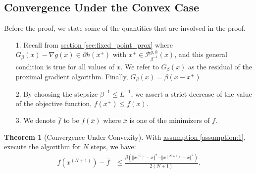 \documentclass[]{article}
\theoremstyle{definition}
\newtheorem{theorem}{Theorem}       %
\begin{document}
    \subsection{Convergence Under the Convex Case}
        Before the proof, we state some of the quantities that are involved in the proof. 
        \begin{enumerate}
            \item [1.] Recall from \hyperref[sec:fixed_point_prox]{section \ref*{sec:fixed_point_prox}} where $G_\beta(x) - \nabla g(x) \in \partial h(x^+)$ with $x^+ \in \mathcal P_{\beta^{-1}}^{g, h}(x)$, and this general condition is true for all values of $x$. We refer to $G_\beta(x)$ as the residual of the proximal gradient algorithm. Finally, $G_\beta(x) = \beta(x - x^+)$
            \item [2.] By choosing the stepsize $\beta^{-1} \le L^{-1}$, we assert a strict decrease of the value of the objective function, $f(x^+) \le f(x)$. 
            \item [3.] We denote $\bar f$ to be $f(\bar x)$ where $\bar x$ is one of the minimizers of $f$. 
        \end{enumerate}
        \begin{theorem}[Convergence Under Convexity]\label{thm:convergence_non_accelerated}
            With \hyperref[assumption:1]{assumption \ref*{assumption:1}}, execute the algorithm for $N$ steps, we have: 
            \begin{align*}
                f(x^{(N + 1)}) - \bar f
                &\le  
                \frac{\beta(\Vert x^{(0)} - \bar x\Vert^2 - \Vert x^{(N + 1)} - \bar x\Vert^2)}{2(N + 1)}. 
            \end{align*}
        \end{theorem}
\end{document}
